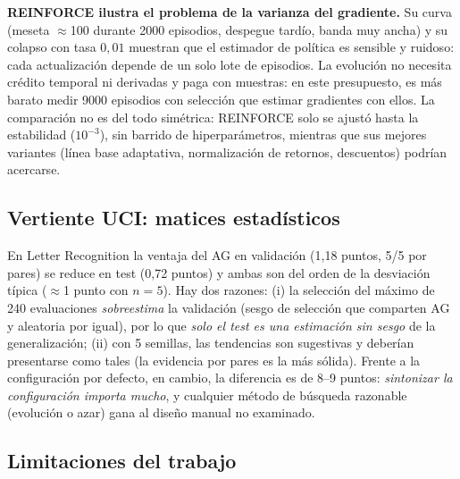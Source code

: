 \textbf{REINFORCE ilustra el problema de la varianza del gradiente.} Su curva (meseta $\approx$100 durante 2000 episodios, despegue tardío, banda muy ancha) y su colapso con tasa $0{,}01$ muestran que el estimador de política es sensible y ruidoso: cada actualización depende de un solo lote de episodios. La evolución no necesita crédito temporal ni derivadas y paga con muestras: en este presupuesto, es más barato medir 9000 episodios con selección que estimar gradientes con ellos. La comparación no es del todo simétrica: REINFORCE solo se ajustó hasta la estabilidad ($10^{-3}$), sin barrido de hiperparámetros, mientras que sus mejores variantes (línea base adaptativa, normalización de retornos, descuentos) podrían acercarse.

\subsection{Vertiente UCI: matices estadísticos}

En Letter Recognition la ventaja del AG en validación (1,18 puntos, 5/5 por pares) se reduce en test (0,72 puntos) y ambas son del orden de la desviación típica ($\approx$1 punto con $n=5$). Hay dos razones: (i) la selección del máximo de 240 evaluaciones \emph{sobreestima} la validación (sesgo de selección que comparten AG y aleatoria por igual), por lo que \emph{solo el test es una estimación sin sesgo} de la generalización; (ii) con 5 semillas, las tendencias son sugestivas y deberían presentarse como tales (la evidencia por pares es la más sólida). Frente a la configuración por defecto, en cambio, la diferencia es de 8--9 puntos: \emph{sintonizar la configuración importa mucho}, y cualquier método de búsqueda razonable (evolución o azar) gana al diseño manual no examinado.

\subsection{Limitaciones del trabajo}

